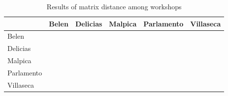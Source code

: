 \documentclass[review]{elsarticle}
\begin{document}
\begin{table}[htp]
\begin{tabular}{lccccc}
\hline
 & Belen & Delicias & Malpica & Parlamento & Villaseca\\ \hline
Belen &  &        &         &           &           \\
Delicias       &   &        &       &         &          \\
Malpica &          &        &          &         &       \\
Parlamento &        &         &       &         &        \\
Villaseca   &       &        &      &          &      \\
\hline

\end{tabular}
\caption{Results of matrix distance among workshops}
\label{table:spatialdistance}
\end{table}
\end{document}
